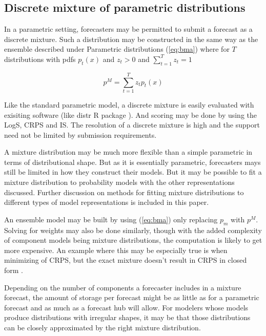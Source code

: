 \documentclass{article}\usepackage[]{graphicx}\usepackage[]{color}
\begin{document}
\subsection{Discrete mixture of parametric distributions}
In a parametric setting, forecasters may be permitted to submit a forecast as a
discrete mixture. Such a distribution may be constructed in the same way as the
ensemble described under Parametric distributions (\ref{eq:bma}) 
where for $T$ distributions
with pdfs $p_t(x)$ and $z_t > 0$ and $\sum_{t=1}^{T} z_t = 1$
 

\begin{equation}
\label{eq:dmd}
  p^{M} = \sum_{t=1}^T z_tp_t(x)
\end{equation}




Like the standard parametric model, a discrete mixture is easily evaluated with
exisiting software (like distr R package \cite{camphausen2007distr}). And 
scoring may be done by 
using the LogS, CRPS and IS. The resolution of a discrete mixture is high 
and the support need not be limited by submission requirements. 

A mixture distribution may be much more flexible than a simple parametric in 
terms of distributional shape. But as it is essentially parametric, forecasters
mays still be limited in how they construct their models. But it may be possible
to fit a mixture distribution to probability models with the other 
representations discussed. Further discussion on methods for fitting mixture 
distributions to different types of model representations is included in this 
paper.

An ensemble model may be built by using (\ref{eq:bma}) only replacing $p_m$
with $p^M$. Solving for weights may also be done similarly, though with the 
added complexity of component models being mixture distributions, the 
computation is likely to get more expensive. An example where this may be
especially true is when minimizing of CRPS, but the exact mixture doesn't 
result in CRPS in closed form \cite{baran2018combining}.

Depending on the number of components a forecaster includes in a mixture 
forecast, the amount of storage per forecast might be as little as for a 
parametric forecast and as much as a forecast hub will allow. For modelers whose
models produce distributions with irregular shapes, it may be that those
distributions can be closely approximated by the right mixture distribution.
\end{document}

